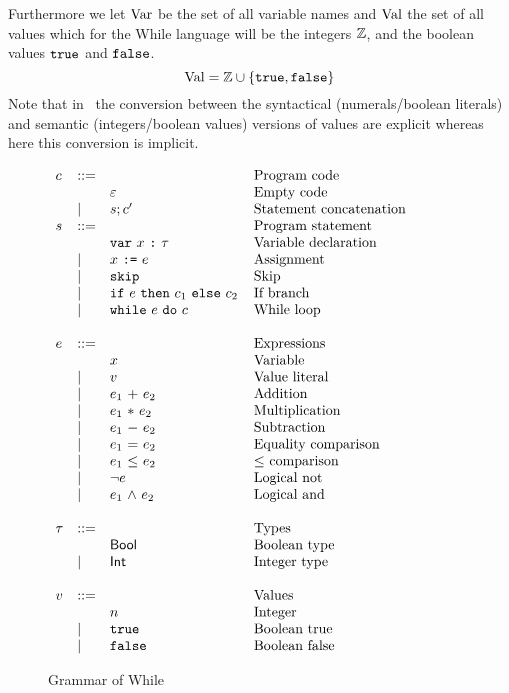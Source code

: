 Furthermore we let $\mbox{$\mathrm{Var}$}$ be the set of all variable names and $\mbox{$\mathrm{Val}$}$ the
set of all values which for the While language will be the integers $\mathbb{Z}$,
and the boolean values $\mbox{\texttt{true}}$ and $\mbox{\texttt{false}}$. 
\begin{equation*}
  \mbox{$\mathrm{Val}$} = \mathbb{Z} \cup \left\{ \mbox{\texttt{true}}, \mbox{\texttt{false}} \right\}
\end{equation*}
Note that in~\parencite{nielson2007semantics} 
the conversion between the syntactical (numerals\slash boolean literals) and semantic
(integers\slash boolean values) versions of values are explicit whereas here 
this conversion is implicit.

\begin{figure}[h]
  \centering
  $\begin{array}{lll@{\hspace{4mm}}l}
    c &::= &  & \mbox{Program code} \\
    &  & \varepsilon & \mbox{Empty code} \\
    &| & s; c' & \mbox{Statement concatenation} \\
    s &::= & & \mbox{Program statement} \\
    &  & \WhDecl{x}{\tau} & \mbox{Variable declaration} \\
    &| & \WhAssign{x}{e} & \mbox{Assignment} \\
    &| & \WhSkip & \mbox{Skip} \\
    &| & \WhIf{e}{c_1}{c_2} & \mbox{If branch} \\
    &| & \WhWhile{e}{c} & \mbox{While loop} \\
    &&&\\
    e & ::= & & \mbox{Expressions} \\
    & & x & \mbox{Variable} \\
    &| & v & \mbox{Value literal} \\
    &| & \WhAdd{e_1}{e_2} & \mbox{Addition} \\
    &| & \WhTimes{e_1}{e_2} & \mbox{Multiplication} \\
    &| & \WhMinus{e_1}{e_2} & \mbox{Subtraction} \\
    &| & \WhEq{e_1}{e_2} & \mbox{Equality comparison} \\
    &| & \WhLeq{e_1}{e_2} & \mbox{$\leq$ comparison} \\
    &| & \WhLnot{e} & \mbox{Logical not} \\
    &| & \WhLand{e_1}{e_2} & \mbox{Logical and} \\
    &&&\\
    \tau & ::= & & \mbox{Types} \\
    & & \WhBool & \mbox{Boolean type} \\
    &| & \WhInt & \mbox{Integer type} \\
    &&&\\
    v & ::= & & \mbox{Values} \\
    &  & n & \mbox{Integer} \\
    &| & \WhTrue & \mbox{Boolean true} \\
    &| & \WhFalse & \mbox{Boolean false} \\
  \end{array}$
  \caption{Grammar of While}
  \label{fig:while_grammar}
\end{figure}

